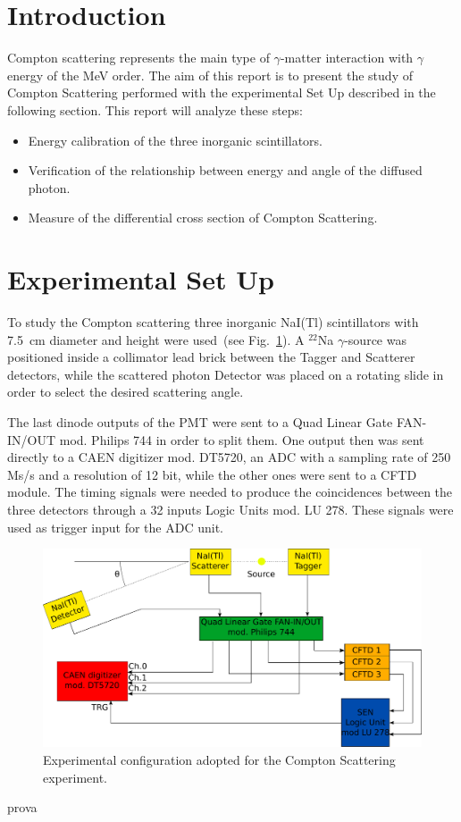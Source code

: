 \section*{Introduction}

Compton scattering represents the main  type of $\gamma$-matter interaction with $\gamma$ energy of the MeV order.   
The aim of this report is to present the study of Compton Scattering performed with the experimental Set Up described in the following section.
This report will analyze these steps:
\begin{itemize}
	\item Energy calibration of the three inorganic scintillators.
	\item Verification of the relationship between energy and angle of the diffused photon.
	\item Measure of the differential cross section of Compton Scattering.
\end{itemize}

\section*{Experimental Set Up}

To study the Compton scattering three inorganic NaI(Tl) scintillators with 7.5~cm diameter and height were used~(see Fig.~\ref{Fig:Set_up}). A $^{22}$Na $\gamma$-source was positioned inside a collimator lead brick between the Tagger and Scatterer detectors, while the scattered photon Detector was placed on a rotating slide in order to select the desired scattering angle.

The last dinode outputs of the PMT were sent to a Quad Linear Gate FAN-IN/OUT mod. Philips 744 in order to split them. One output then was sent directly to a CAEN digitizer mod. DT5720, an ADC with a sampling rate of 250 Ms/s and a resolution of 12 bit, while the other ones were sent to a  CFTD module. The timing signals were needed to produce the coincidences between the three detectors through a 32 inputs Logic Units mod. LU 278. These signals were used as trigger input for the ADC unit.

\begin{figure}[h!]
	\centering
	\includegraphics[width=\textwidth]{immagini/SetUp.pdf}
	\caption{Experimental configuration adopted for the Compton Scattering experiment.}
	\label{Fig:Set_up}
\end{figure}

prova